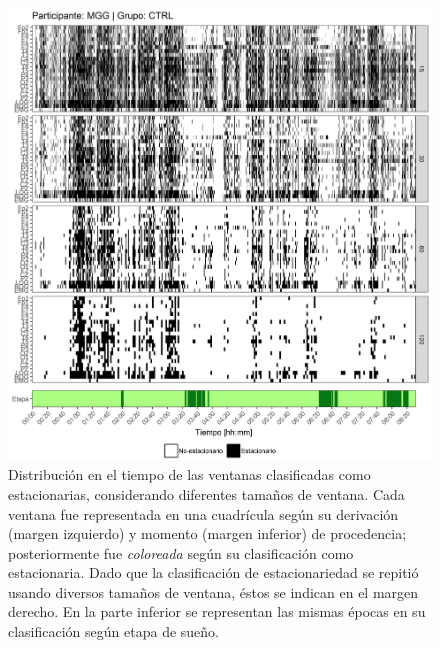 \begin{figure}
\centering
\includegraphics[width=\linewidth]
{./scripts_graf_res/MGG_patrones_2.png}
\caption[Distribución en el tiempo de las ventanas clasificadas como estacionarias, considerando diferentes tamaños de ventana]{Distribución en el tiempo de las ventanas clasificadas como estacionarias, considerando diferentes tamaños de ventana. 
Cada ventana fue representada en una cuadrícula según su derivación (margen izquierdo) y momento (margen inferior) de procedencia; posteriormente fue \textit{coloreada} según su clasificación como estacionaria.
Dado que la clasificación de estacionariedad se repitió usando diversos tamaños de ventana, éstos se indican en el margen derecho.
En la parte inferior se representan las mismas épocas en su clasificación según etapa de sueño.}
\end{figure}


